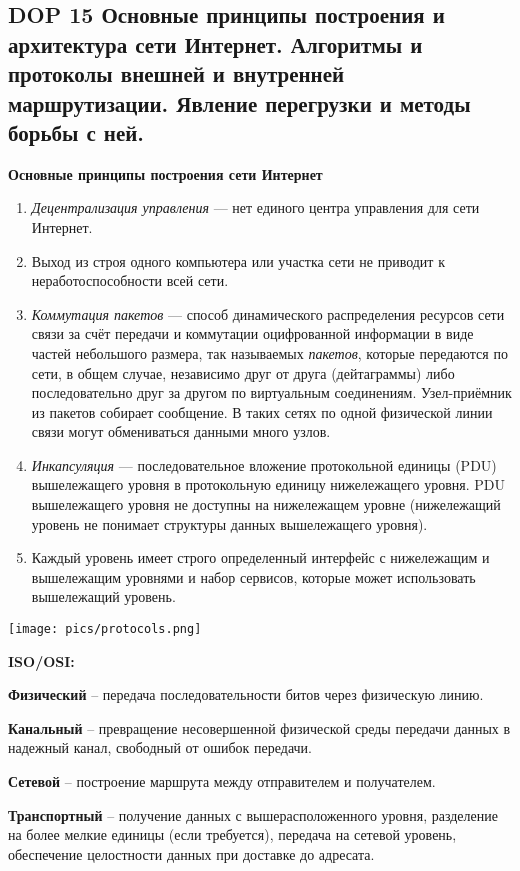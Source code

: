 \subsection{DOP 15 Основные  принципы  построения  и  архитектура  сети  Интернет.  Алгоритмы  и  протоколы  внешней  и внутренней маршрутизации. Явление перегрузки и методы борьбы с ней.}

\textbf{Основные принципы построения сети Интернет}

\begin{enumerate}
    \item \textit{Децентрализация управления} --- нет единого центра управления для сети Интернет.
    \item Выход из строя одного компьютера или участка сети не приводит к неработоспособности всей сети.
    \item \textit{Коммутация пакетов} --- способ динамического распределения ресурсов сети связи за счёт передачи и коммутации оцифрованной информации в виде частей небольшого размера, так называемых \textit{пакетов}, которые передаются по сети, в общем случае, независимо друг от друга (дейтаграммы) либо последовательно друг за другом по виртуальным соединениям. 
    Узел-приёмник из пакетов собирает сообщение. 
    В таких сетях по одной физической линии связи могут обмениваться данными много узлов.
    \item \textit{Инкапсуляция} --- последовательное вложение протокольной единицы (PDU) вышележащего уровня в протокольную единицу нижележащего уровня. 
    PDU вышележащего уровня не доступны на нижележащем уровне (нижележащий уровень не понимает структуры данных вышележащего уровня).
    \item Каждый уровень имеет строго определенный интерфейс с нижележащим и вышележащим уровнями и набор сервисов, которые может использовать вышележащий уровень.
\end{enumerate}

\bigbreak
\texttt{[image: pics/protocols.png]}

\textbf{ISO/OSI:}

\textbf{Физический} -- передача последовательности битов через физическую линию.

\textbf{Канальный} -- превращение несовершенной физической среды передачи данных в надежный канал, свободный от ошибок передачи.

\textbf{Сетевой} -- построение маршрута между отправителем и получателем.

\textbf{Транспортный} -- получение данных с вышерасположенного уровня, разделение на более мелкие единицы (если требуется), передача на сетевой уровень, обеспечение целостности данных при доставке до адресата.

